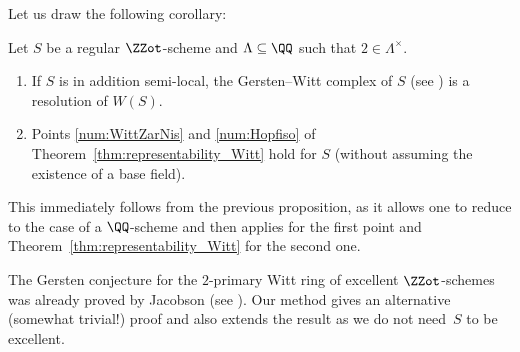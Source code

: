 Let us draw the following corollary:
\begin{cor}\label{cor:Gersten--Witt_conj}
Let $S$ be a regular $\ZZot$-scheme and $\Lambda \subseteq \QQ$
such that $2 \in \Lambda^\times$.
\begin{enumerate}
\item If $S$ is in addition semi-local,
the Gersten--Witt complex of $S$ (see \cite{BalmerWalter}) is a resolution of $W(S)$.
\item Points \eqref{num:WittZarNis} and \eqref{num:Hopfiso} of Theorem~\ref{thm:representability_Witt}
hold for $S$ (\ie without assuming the existence of a base field).
\end{enumerate}
\end{cor}
This immediately follows from the previous proposition,
as it allows one to reduce to the case of a $\QQ$-scheme and then applies
\cite[4.3]{BalmerWitt} for the first point and Theorem~\ref{thm:representability_Witt}
for the second one.

\begin{rem}\label{rem:Jacobson}
The Gersten conjecture for the $2$-primary Witt ring of excellent $\ZZot$-schemes
was already proved by Jacobson (see \cite[5.3]{Jacobson}).
Our method gives an alternative (somewhat trivial!) proof
and also extends the result as we do not need~$S$ to be excellent.
\end{rem}

